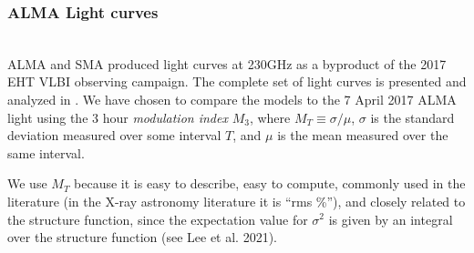 

\subsubsection{ALMA Light curves}

\\
ALMA and SMA produced \sgra light curves at 230GHz as a byproduct of the 2017 EHT VLBI observing campaign. The complete set of light curves is presented and analyzed in \cite{Wielgus2022}. We have chosen to compare the models to the 7 April 2017 ALMA light using
the 3 hour {\em modulation index} $M_3$, where $M_T \equiv
\sigma/\mu$, $\sigma$ is the standard deviation measured over some
interval $T$, and $\mu$ is the mean measured over the same interval.

We use $M_T$ because it is easy to describe, easy to compute, commonly used in the literature (in the X-ray astronomy literature it is ``rms \%''), and closely related to the structure function, since the expectation value for $\sigma^2$ is given by an integral over the structure function (see Lee et al. 2021).

